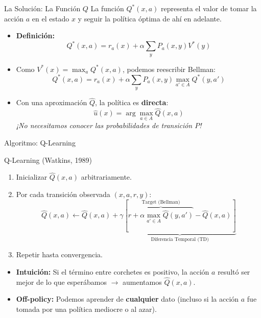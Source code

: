 \documentclass[xcolor=dvipsnames, handout]{beamer}
\begin{document}
\begin{frame}{La Soluci\'on: La Funci\'on $Q$}
La funci\'on $Q^*(x,a)$ representa el valor de tomar la acci\'on $a$ en el estado $x$ y seguir la pol\'itica \'optima de ah\'i en adelante.

\begin{itemize}
    \item \textbf{Definici\'on:} 
    \[ Q^*(x,a) = r_a(x) + \alpha \sum_y P_a(x,y) V^*(y) \]
    
    \item<2-> Como $V^*(x) = \max_a Q^*(x,a)$, podemos reescribir Bellman:
    \[ Q^*(x,a) = r_a(x) + \alpha \sum_y P_a(x,y) \max_{a' \in A} Q^*(y,a') \]
    
    \item<3->  Con una aproximaci\'on $\hat Q$, la pol\'itica es \textbf{directa}:
    \[ \hat u(x) = \arg\max_{a \in A} \hat Q(x,a) \]
    \textit{¡No necesitamos conocer las probabilidades de transici\'on $P$!}
\end{itemize}
\end{frame}

\begin{frame}{Algoritmo: Q-Learning}
\begin{block}{Q-Learning (Watkins, 1989)}
\begin{enumerate}
    \item Inicializar $\hat Q(x,a)$ arbitrariamente.
    \item Por cada transici\'on observada $(x, a, r, y)$:
    \[ \hat Q(x,a) \leftarrow \hat Q(x,a) + \gamma \underbrace{\left[ \overbrace{r + \alpha \max_{a' \in A} \hat Q(y,a')}^{\text{Target (Bellman)}} - \hat Q(x,a) \right]}_{\text{Diferencia Temporal (TD)}} \]
    \item Repetir hasta convergencia.
\end{enumerate}
\end{block}

\begin{itemize}
    \item<2-> \textbf{Intuici\'on:} Si el término entre corchetes es positivo, la acción $a$ resultó ser mejor de lo que esperábamos $\rightarrow$ aumentamos $\hat Q(x,a)$.
    \item<3-> \textbf{Off-policy:} Podemos aprender de \textbf{cualquier} dato (incluso si la acción $a$ fue tomada por una política mediocre o al azar).
\end{itemize}
\end{frame}
\end{document}
